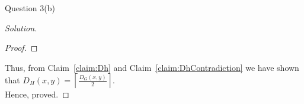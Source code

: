 \begin{solution}{Question 3(b)}
\begin{proof}[Solution]
\begin{proof}
      \end{proof}
      Thus, from Claim~\ref{claim:Dh} and Claim~\ref{claim:DhContradiction} we have shown that $D_H(x, y) = \left\lceil\frac{D_G(x, y)}{2}\right\rceil$.\\
      Hence, proved.
    \end{proof}
\end{solution}
